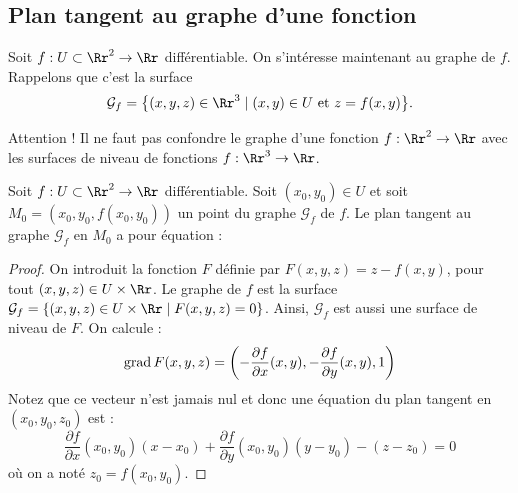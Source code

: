\documentclass[11pt, class=report,crop=false]{standalone}
\begin{document}
\subsection{Plan tangent au graphe d'une fonction}

Soit $f : U \subset \Rr^2 \to \Rr$ différentiable.
On s'intéresse maintenant au graphe de $f$. Rappelons que c'est la surface
$$\mathcal{G}_f = \big\{ (x,y,z) \in \Rr^3 \mid (x,y)\in U \text{ et } z = f(x,y) \big\}.$$

Attention ! Il ne faut pas confondre le graphe d'une fonction $f : \Rr^2 \to \Rr$
avec les surfaces de niveau de fonctions $f : \Rr^3 \to \Rr$.


\begin{proposition}
Soit $f : U \subset \Rr^2 \to \Rr$ différentiable. Soit $(x_0,y_0) \in U$ et 
soit $M_0=(x_0,y_0,f(x_0,y_0))$ un point du graphe $\mathcal{G}_f$ de $f$.
Le plan tangent au graphe $\mathcal{G}_f$ en $M_0$ a pour équation :
\end{proposition}





\begin{proof}
On introduit la fonction $F$ définie par
$F(x,y,z)=z-f(x,y)$, pour tout $(x,y,z)\in U\times \Rr$.
Le graphe de $f$ est la surface $\mathcal{G}_f=\{(x,y,z)\in U\times \Rr\mid F(x,y,z)=0\}$.
Ainsi, $\mathcal{G}_f$ est aussi une surface de niveau de $F$.
On calcule : 
$$\operatorname{grad} F (x,y,z)=\left(-\frac{\partial f}{\partial x}(x,y),-\frac{\partial f}{\partial y}(x,y),1\right)$$
Notez que ce vecteur n'est jamais nul et donc une équation du plan tangent en $(x_0,y_0,z_0)$ est :
$$\frac{\partial f}{\partial x}(x_0,y_0)(x-x_0)
+\frac{\partial f}{\partial y}(x_0,y_0)(y-y_0) - (z-z_0) = 0$$
où on a noté $z_0 = f(x_0,y_0)$.
\end{proof}
\end{document}
